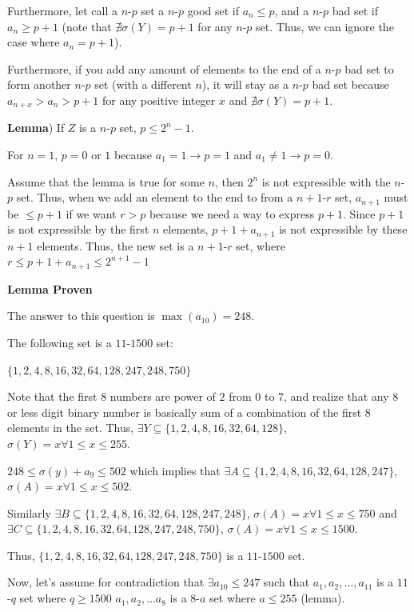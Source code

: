 \begin{enumerate}
 
Furthermore, let call a $n$-$p$ set a $n$-$p$ good set if $a_n\le p$, and a $n$-$p$ bad set if $a_n\ge p+1$ (note that $\nexists \sigma(Y)=p+1$ for any $n$-$p$ set. Thus, we can ignore the case where $a_n=p+1$).

 
Furthermore, if you add any amount of elements to the end of a $n$-$p$ bad set to form another $n$-$p$ set (with a different $n$), it will stay as a $n$-$p$ bad set because $a_{n+x}>a_{n}>p+1$ for any positive integer $x$ and $\nexists \sigma(Y)=p+1$.

 
\textbf{Lemma}) If $Z$ is a $n$-$p$ set, $p\leq 2^n-1$.

 
For $n=1$, $p=0$ or $1$ because $a_1=1 \rightarrow p=1$ and $a_1\ne1\rightarrow p=0$.

 Assume that the lemma is true for some $n$, then $2^n$ is not expressible with the $n$-$p$ set. Thus, when we add an element to the end to from a $n+1$-$r$ set, $a_{n+1}$ must be $\le p+1$ if we want $r>p$ because we need a way to express $p+1$. Since $p+1$ is not expressible by the first $n$ elements, $p+1+a_{n+1}$ is not expressible by these $n+1$ elements. Thus, the new set is a $n+1$-$r$ set, where $r\leq p+1+a_{n+1} \leq 2^{n+1}-1$

 \textbf{Lemma Proven}

 
The answer to this question is $\max{(a_{10})}=248$.

 The following set is a $11$-$1500$ set: 

 $\{1,2,4,8,16,32,64,128,247,248,750\}$

 Note that the first 8 numbers are power of $2$ from $0$ to $7$, and realize that any $8$ or less digit binary number is basically sum of a combination of the first $8$ elements in the set. Thus, $\exists Y\subseteq\{1,2,4,8,16,32,64,128\}$, $\sigma(Y)=x \forall 1\le x\leq 255$. 

 $248\le\sigma(y)+a_9\le502$ which implies that $\exists A\subseteq\{1,2,4,8,16,32,64,128,247\}$, $\sigma(A)=x \forall 1\le x\leq 502$.

 Similarly $\exists B\subseteq\{1,2,4,8,16,32,64,128,247,248\}$, $\sigma(A)=x \forall 1\le x\le750$ and $\exists C\subseteq\{1,2,4,8,16,32,64,128,247,248,750\}$, $\sigma(A)=x \forall 1\leq x\leq 1500$.

 
Thus, $\{1,2,4,8,16,32,64,128,247,248,750\}$ is a $11$-$1500$ set.

 

Now, let's assume for contradiction that $\exists a_{10}\leq 247$ such that ${a_1, a_2, \dots, a_{11}}$ is a $11$-$q$ set where $q\geq 1500$
${a_1, a_2, \dots a_8}$ is a $8$-$a$ set where $a\leq 255$ (lemma).


\end{enumerate}
